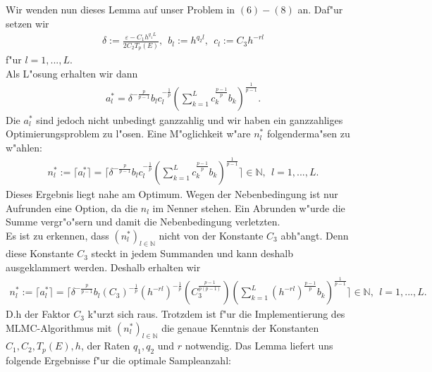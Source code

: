  Wir wenden nun dieses Lemma auf unser Problem in $(6)-(8)$ an. Daf"ur setzen wir
 \begin{align}\label{delta}
 \delta:=\frac{\varepsilon-C_1h^{q_1L}}{2C_2T_p(E)},\ \ b_l:=h^{q_2l},\ \ c_l:=C_3h^{-rl}
 \end{align} f"ur $l=1,...,L$.\\
 Als L"osung erhalten wir dann
 \begin{align*}
 a_l^*=\delta^{-\frac{p}{p-1}}b_lc_l^{-\frac{1}{p}}\left(\sum_{k=1}^L c_k^{\frac{p-1}{p}}b_k\right)^{\frac{1}{p-1}}.
 \end{align*}
 Die $a_l^*$ sind jedoch nicht unbedingt ganzzahlig und wir haben ein ganzzahliges Optimierungsproblem zu l"osen.
 Eine M"oglichkeit w"are $n_l^*$ folgenderma"sen zu w"ahlen:
 \begin{align}\label{n}
n_l^*:= \lceil a_l^* \rceil=\Big\lceil  \delta^{-\frac{p}{p-1}}b_lc_l^{-\frac{1}{p}}\left(\sum_{k=1}^L c_k^{\frac{p-1}{p}}b_k\right)^{\frac{1}{p-1}}\Big\rceil \in \mathbb{N}, \ \ l=1,...,L. 
 \end{align}
Dieses Ergebnis liegt nahe am Optimum. Wegen der Nebenbedingung ist nur Aufrunden eine Option, da die $n_l$ im Nenner stehen. Ein Abrunden w"urde die Summe vergr"o"sern und damit die Nebenbedingung verletzten.\\
Es ist zu erkennen, dass $(n_l^*)_{l\in\mathbb{N}}$ nicht von der Konstante $C_3$ abh"angt.
Denn diese Konstante $C_3$ steckt in jedem Summanden und kann deshalb ausgeklammert werden. Deshalb erhalten wir
\begin{align*}
n_l^*:= \lceil a_l^* \rceil=\Big\lceil  \delta^{-\frac{p}{p-1}}b_l (C_3)^{-\frac{1}{p}}( h^{-rl})^{-\frac{1}{p}}(C_3^{\frac{p-1}{p(p-1)}})\left(\sum_{k=1}^L (h^{-rl})^{\frac{p-1}{p}}b_k\right)^{\frac{1}{p-1}}\Big\rceil \in \mathbb{N}, \ \ l=1,...,L. 
\end{align*}
D.h der Faktor $C_3$ k"urzt sich raus. Trotzdem ist f"ur die Implementierung des MLMC-Algorithmus mit $(n_l^*)_{l\in\mathbb{N}}$ die genaue Kenntnis der Konstanten $C_1,C_2,T_p(E),h$, der Raten $q_1,q_2$ und $r$ notwendig.
\newpage
Das Lemma liefert uns folgende Ergebnisse f"ur die optimale Sampleanzahl:

